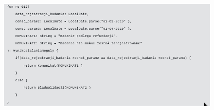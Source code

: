 \begin{figure}[H]
	\centering
	\includegraphics[scale=0.8]{img/app-eksperymenty/p3-3.png}
\end{figure}